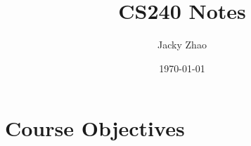 \documentclass[letterpaper, 12pt]{article}
\begin{document}
    
    \clearpage
    \vspace*{\fill}
    \begin{center}
        \begin{minipage}{\textwidth} 
            \title{CS240 Notes}
            \author{Jacky Zhao}
            \date{\today}
            \maketitle
        \end{minipage} 
    \end{center}
    \vfill
    \thispagestyle{empty}
    \newpage
    \setcounter{page}{1}

    \section{Course Objectives}
\end{document}
